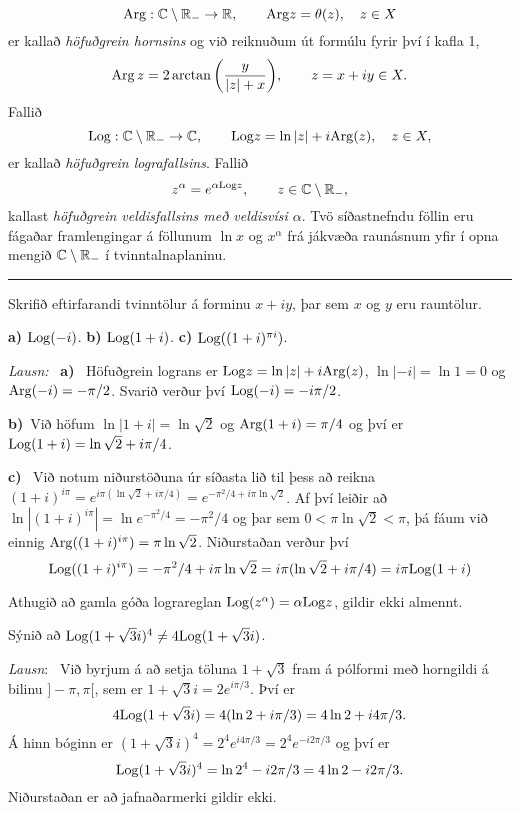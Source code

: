  $${\operatorname{Arg}} :{\mathbb C}\setminus {\mathbb R}_-\to {\mathbb R}, \qquad
{\operatorname{Arg}} z=\theta(z),\quad z\in X
 $$
er kallað {\it höfuðgrein
hornsins} og 
við reiknuðum út formúlu fyrir því í kafla 1,
$$
{\operatorname{Arg}}\, z=2\arctan\bigg(\dfrac y{|z|+x}\bigg), \qquad z=x+iy\in X. 
$$
Fallið
 $${\operatorname{Log}} :{\mathbb C}\setminus {\mathbb R}_-\to {\mathbb C}, \qquad
{\operatorname{Log}} z=\ln |z| +i{\operatorname{Arg}}(z),\quad z\in X,
 $$
er kallað {\it höfuðgrein
lografallsins}.  Fallið 
 $$z^\alpha = e^{\alpha{\operatorname{Log}} z}, \qquad z\in {\mathbb C}\setminus {\mathbb R}_-,
 $$
kallast {\it höfuðgrein
veldisfallsins með
veldisvísi $\alpha$}. Tvö síðastnefndu föllin eru fágaðar framlengingar á föllunum
$\ln x$  og $x^\alpha$ frá jákvæða raunásnum  yfir
í opna mengið ${\mathbb C}\setminus {\mathbb R}_-$ í tvinntalnaplaninu.


\bigskip\hrule\bigskip

\begin{sy}
Skrifið eftirfarandi  tvinntölur á forminu $x+iy$, þar sem 
$x$ og $y$ eru rauntölur.

\smallskip\noindent
{\bf a)} \quad  ${\operatorname{Log}}{(-i)}$. \qquad 
{\bf b)} \quad  ${\operatorname{Log}}({1+i})$. \qquad 
{\bf c)} \quad  ${\operatorname{Log}}((1+i)^{\pi i})$. 


\smallskip\noindent
{\it Lausn:} \   {\bf a)} \ Höfuðgrein lograns
er ${\operatorname{Log}} z=\ln |z|+i {\operatorname{Arg}}(z)$, $\ln|-i|=\ln 1=0$ og 
${\operatorname{Arg}}(-i)=-\pi/2$.  Svarið verður því ${\operatorname{Log}}(-i)=-i\pi/2$.

\smallskip\noindent
{\bf b)}\  Við höfum  $\ln|1+i|=\ln\sqrt 2$ og ${\operatorname{Arg}}(1+i)=\pi/4$
og því er ${\operatorname{Log}}(1+i)=\ln \sqrt 2+i\pi/4$.

\smallskip\noindent
{\bf c)} \  Við notum niðurstöðuna úr síðasta lið til þess að
reikna $(1+i)^{i\pi}=e^{i\pi(\ln\sqrt 2+i\pi/4)}=e^{-\pi^2/4+i\pi
\ln\sqrt 2}$.  Af því leiðir að $\ln|(1+i)^{i\pi}|=\ln
e^{-\pi^2/4}=-\pi^2/4$ og þar sem $0<\pi\ln \sqrt 2<\pi$, þá fáum við einnig
${\operatorname{Arg}}((1+i)^{i\pi})=\pi\ln\sqrt 2$.  Niðurstaðan verður því 
$$
{\operatorname{Log}}((1+i)^{i\pi})=-\pi^2/4+i\pi\ln\sqrt 2=i\pi(\ln\sqrt
2+i\pi/4)=i\pi{\operatorname{Log}}(1+i)
$$
\end{sy}

\smallskip
Athugið að gamla góða lograreglan ${\operatorname{Log}} (z^\alpha)=\alpha {\operatorname{Log}} z$, gildir
ekki almennt.

\smallskip

\begin{sy}  Sýnið að ${\operatorname{Log}}(1+\sqrt 3 i)^4\neq 4 {\operatorname{Log}}(1+\sqrt 3 i)$.


\smallskip\noindent
{\it Lausn}: \  Við byrjum á að setja töluna $1+\sqrt 3$ fram á
pólformi með horngildi á bilinu $]-\pi,\pi[$, sem er
$1+\sqrt 3 i=2e^{i{\pi}/3}$.  Því er
$$
4{\operatorname{Log}} (1+\sqrt 3 i)=4(\ln 2+i{\pi}/3)=4\ln 2+i4{\pi}/3.
$$
Á hinn bóginn er
$(1+\sqrt 3 i)^4=2^4e^{i4{\pi}/3}=
2^4e^{-i2{\pi}/3}$ og því er
$$
{\operatorname{Log}} (1+\sqrt 3 i)^4=\ln 2^4-i2{\pi}/3=4\ln 2-i2{\pi}/3.
$$
Niðurstaðan er að jafnaðarmerki gildir ekki. 
\end{sy}



